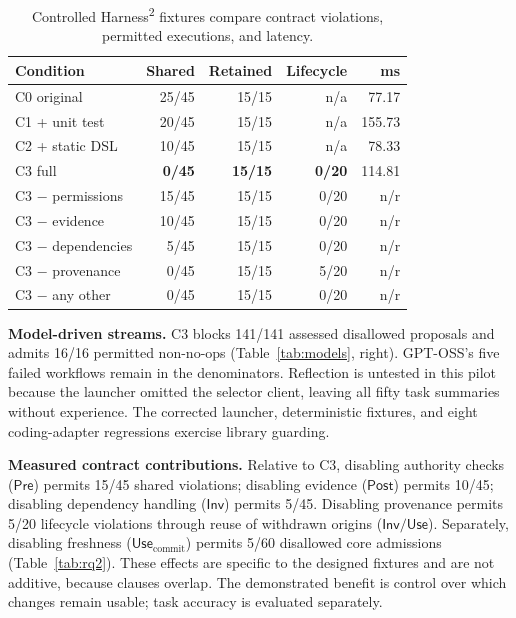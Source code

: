 \documentclass[letterpaper,journal]{IEEEtran}
\newcommand{\harness}{Harness\textsuperscript{2}}
\begin{document}
\begin{table}[t]\caption{Controlled \harness{} fixtures compare contract violations, permitted executions, and latency.}\label{tab:rq3}\centering\footnotesize
\setlength{\tabcolsep}{3.5pt}
\begin{tabular}{lrrrr}\toprule
Condition & Shared & Retained & Lifecycle & ms\\\midrule
C0 original & 25/45 & 15/15 & n/a & 77.17\\
C1 + unit test & 20/45 & 15/15 & n/a & 155.73\\
C2 + static DSL & 10/45 & 15/15 & n/a & 78.33\\
C3 full & \textbf{0/45} & \textbf{15/15} & \textbf{0/20} & 114.81\\\midrule
C3 $-$ permissions & 15/45 & 15/15 & 0/20 & n/r\\
C3 $-$ evidence & 10/45 & 15/15 & 0/20 & n/r\\
C3 $-$ dependencies & 5/45 & 15/15 & 0/20 & n/r\\
C3 $-$ provenance & 0/45 & 15/15 & 5/20 & n/r\\
C3 $-$ any other & 0/45 & 15/15 & 0/20 & n/r\\\bottomrule
\end{tabular}\end{table}

\textbf{Model-driven streams.} C3 blocks 141/141 assessed disallowed proposals and admits 16/16 permitted non-no-ops (Table~\ref{tab:models}, right). GPT-OSS's five failed workflows remain in the denominators. Reflection is untested in this pilot because the launcher omitted the selector client, leaving all fifty task summaries without experience. The corrected launcher, deterministic fixtures, and eight coding-adapter regressions exercise library guarding.

\textbf{Measured contract contributions.} Relative to C3, disabling authority checks ($\mathsf{Pre}$) permits 15/45 shared violations; disabling evidence ($\mathsf{Post}$) permits 10/45; disabling dependency handling ($\mathsf{Inv}$) permits 5/45. Disabling provenance permits 5/20 lifecycle violations through reuse of withdrawn origins ($\mathsf{Inv}/\mathsf{Use}$). Separately, disabling freshness ($\mathsf{Use}_{\mathrm{commit}}$) permits 5/60 disallowed core admissions (Table~\ref{tab:rq2}). These effects are specific to the designed fixtures and are not additive, because clauses overlap. The demonstrated benefit is control over which changes remain usable; task accuracy is evaluated separately.
\end{document}

